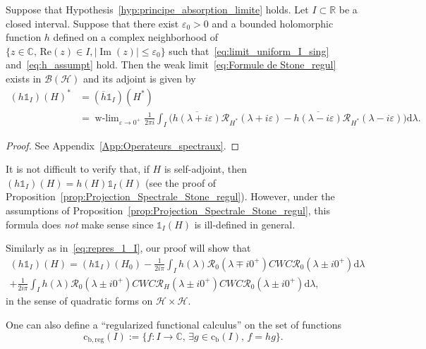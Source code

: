\documentclass[AHL,Unicode,longabstracts,published]{cedram}
\newcommand{\Hi}{\mathcal{H}}
\newcommand{\bbC}{\mathbb{C}}
\newcommand{\R}{\mathbb{R}}
\newcommand{\rmc}{\mathrm{c}}
\newcommand{\rmd}{\mathrm{d}}
\newcommand{\rmb}{\mathrm{b}}
\newcommand{\reg}{\mathrm{reg}}
\newcommand{\Res}{\mathcal{R}}
\newcommand{\clB}{\mathcal{B}}
\DeclareMathOperator{\wlim}{w-lim}
\DeclareMathOperator{\im}{Im}
\let\oldexists\exists
\renewcommand*{\exists}{\mathrel{\oldexists}}
\newcommand*\bbC{\mathbb{C}}
\newcommand{\Hi}{\mathcal{H}}
\newcommand{\R}{\mathbb{R}}
\DeclareMathOperator{\im}{Im}
\begin{document}
\begin{prop}\label{prop:Projection_Spectrale_Stone_regul}
Suppose that Hypothesis~\ref{hyp:principe_absorption_limite} holds. Let $I\subset\R$ be a closed interval. Suppose that there exist $\varepsilon_0>0$ and a bounded holomorphic function $h$ defined on a complex neighborhood of $\{z\in\bbC,\, \mathrm{Re}(z)\in I, |\im(z)|\le\varepsilon_0\}$ such that~\eqref{eq:limit_uniform_I_sing} and~\eqref{eq:h_assumpt} hold. Then the weak limit~\eqref{eq:Formule de Stone_regul} exists in $\clB(\Hi)$ and its adjoint is given by
\begin{align*}
(h\mathds{1}_I)(H)^*&=(\overline{h}\mathds{1}_I)(H^*)\\
&=\wlim_{\varepsilon\rightarrow 0^+}\frac{1}{2\pi i}\int_I\big(\overline{h(\lambda+i\varepsilon)}\Res_{H^*}(\lambda+i\varepsilon)-\overline{h(\lambda-i\varepsilon)}\Res_{H^*}(\lambda-i\varepsilon)\big)\rmd \lambda.
\end{align*}
\end{prop}


\begin{proof}
See Appendix~\ref{App:Operateurs_spectraux}.
\end{proof}

It is not difficult to verify that, if $H$ is self-adjoint, then $(h \mathds{1}_I)(H)=h(H)\mathds{1}_I(H)$ (see the proof of Proposition~\ref{prop:Projection_Spectrale_Stone_regul}). However, under the assumptions of Proposition~\ref{prop:Projection_Spectrale_Stone_regul}, this formula does \emph{not} make sense since $\mathds{1}_I(H)$ is ill-defined in general.

Similarly as in~\eqref{eq:repres_1_I}, our proof will show that
\begin{multline}\label{eq:repres_1_I_h}
(h \mathds{1}_I)(H) = (h\mathds{1}_I)(H_0) - \frac{1}{2i\pi} \int_I h(\lambda) \Res_{0}(\lambda\mp i0^+)CWC\Res_{0}(\lambda\pm i0^+) \rmd \lambda \\
+ \frac{1}{2i\pi} \int_I h(\lambda) \Res_0(\lambda\pm i0^+) CWC\Res_H(\lambda\pm i0^+)CWC\Res_0(\lambda\pm i0^+) \rmd \lambda, 
\end{multline}
in the sense of quadratic forms on $\Hi\times\Hi$.


One can also define a ``regularized functional calculus'' on the set of functions
\begin{equation*}
\rmc_{\rmb,\reg}(I):=\big\{ f:I\to\bbC, \, \exists g\in \rmc_{\rmb}(I), \, f=hg \}.
\end{equation*}
\end{document}
